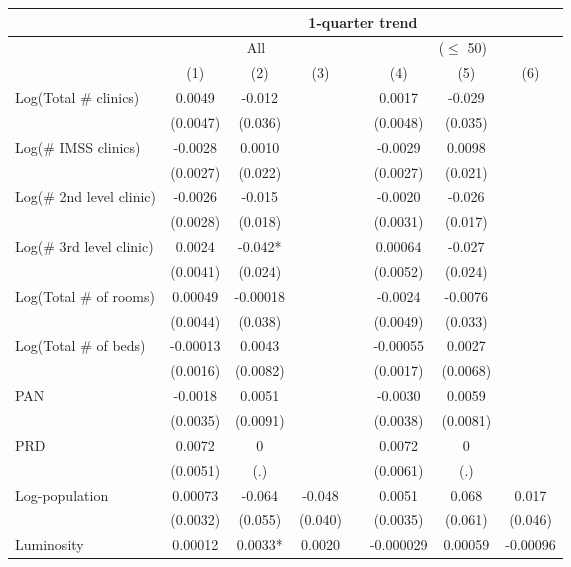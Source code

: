 \begin{tabular}{lccccccc}
\toprule
      & \multicolumn{7}{c}{1-quarter trend} \\
\midrule
      & \multicolumn{3}{c}{All} &       & \multicolumn{3}{c}{($\leq$ 50)} \\
\cmidrule{2-4}\cmidrule{6-8}      & (1)   & (2)   & (3)   &       & (4)   & (5)   & (6) \\
\midrule
\midrule
Log(Total \# clinics) & 0.0049 & -0.012 &       &       & 0.0017 & -0.029 &  \\
      & (0.0047) & (0.036) &       &       & (0.0048) & (0.035) &  \\
Log(\# IMSS clinics) & -0.0028 & 0.0010 &       &       & -0.0029 & 0.0098 &  \\
      & (0.0027) & (0.022) &       &       & (0.0027) & (0.021) &  \\
Log(\# 2nd level clinic) & -0.0026 & -0.015 &       &       & -0.0020 & -0.026 &  \\
      & (0.0028) & (0.018) &       &       & (0.0031) & (0.017) &  \\
Log(\# 3rd level clinic) & 0.0024 & -0.042* &       &       & 0.00064 & -0.027 &  \\
      & (0.0041) & (0.024) &       &       & (0.0052) & (0.024) &  \\
Log(Total \# of rooms) & 0.00049 & -0.00018 &       &       & -0.0024 & -0.0076 &  \\
      & (0.0044) & (0.038) &       &       & (0.0049) & (0.033) &  \\
Log(Total \# of beds) & -0.00013 & 0.0043 &       &       & -0.00055 & 0.0027 &  \\
      & (0.0016) & (0.0082) &       &       & (0.0017) & (0.0068) &  \\
PAN   & -0.0018 & 0.0051 &       &       & -0.0030 & 0.0059 &  \\
      & (0.0035) & (0.0091) &       &       & (0.0038) & (0.0081) &  \\
PRD   & 0.0072 & 0     &       &       & 0.0072 & 0     &  \\
      & (0.0051) & (.)   &       &       & (0.0061) & (.)   &  \\
\midrule
Log-population & 0.00073 & -0.064 & -0.048 &       & 0.0051 & 0.068 & 0.017 \\
      & (0.0032) & (0.055) & (0.040) &       & (0.0035) & (0.061) & (0.046) \\
Luminosity & 0.00012 & 0.0033* & 0.0020 &       & -0.000029 & 0.00059 & -0.00096 \\

\end{tabular}
